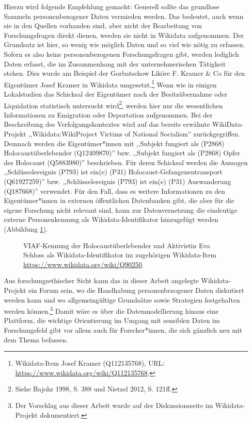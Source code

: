 Hierzu wird folgende Empfehlung gemacht: Generell sollte das grundlose Sammeln personenbezogener Daten vermieden werden. Das bedeutet, auch wenn sie in den Quellen vorhanden sind, aber nicht der Bearbeitung von Forschungsfragen direkt dienen, werden sie nicht in Wikidata aufgenommen. Der Grundsatz ist hier, so wenig wie möglich Daten und so viel wie nötig zu erfassen. Sofern es also keine personenbezogenen Forschungsfragen gibt, werden lediglich Daten erfasst, die im Zusammenhang mit der unternehmerischen Tätigkeit stehen. Dies wurde am Beispiel der Gorbatschow Liköre F. Kramer \& Co für den Eigentümer Josef Kramer in Wikidata umgesetzt.\footnote{Wikidata-Item Josef Kramer (Q112135768), URL: \url{https://www.wikidata.org/wiki/Q112135768}.} Wenn wie in einigen Lokalstudien das Schicksal der Eigentümer nach der Besitzübernahme oder Liquidation statistisch untersucht wird\footnote{Siehe Bajohr 1998, S. 388 und Nietzel 2012, S. 121ff.}, werden hier nur die wesentlichen Informationen zu Emigration oder Deportation aufgenommen. Bei der Beschreibung des Verfolgungskontextes wird auf das bereits erwähnte WikiData-Projekt ,,Wikidata:WikiProject Victims of National Socialism'' zurückgegriffen. Demnach werden die Eigentümer*innen mit ,,Subjekt fungiert als (P2868) Holocaustüberlebender (Q12409870)'' bzw. ,,Subjekt fungiert als (P2868) Opfer des Holocaust (Q5883980)'' beschrieben. Für deren Schicksal werden die Aussagen ,,Schlüsselereignis (P793) ist ein(e) (P31) Holocaust-Gefangenentransport (Q61927259)'' bzw. ,,Schlüsselereignis (P793) ist ein(e) (P31) Auswanderung (Q187668)'' verwendet. Für den Fall, dass es weitere Informationen zu den Eigentümer*innen in externen öffentlichen Datenbanken gibt, die aber für die eigene Forschung nicht relevant sind, kann zur Datenvernetzung die eindeutige externe Personenkennung als Wikidata-Identifikator hinzugefügt werden (Abbildung \ref{fig:wikidataidentificator}).

\begin{figure}[h]
    \centering
    \caption{VIAF-Kennung der Holocaustüberlebender und Aktivistin Eva Schloss als Wikidata-Identifikator im zugehörigen Wikidata-Item \url{https://www.wikidata.org/wiki/Q90250}.}
    \label{fig:wikidataidentificator}
\end{figure}

Aus forschungsethischer Sicht kann das in dieser Arbeit angelegte Wikidata-Projekt ein Forum sein, wo die Handhabung personenbezogener Daten diskutiert werden kann und wo allgemeingültige Grundsätze sowie Strategien festgehalten werden können.\footnote{Der Vorschlag aus dieser Arbeit wurde auf der Diskussionsseite im Wikidata-Projekt dokumentiert.} Damit wäre es über die Datenmodellierung hinaus eine Plattform, die wichtige Orientierung im Umgang mit sensiblen Daten im Forschungsfeld gibt vor allem auch für Forscher*innen, die sich gänzlich neu mit dem Thema befassen.

